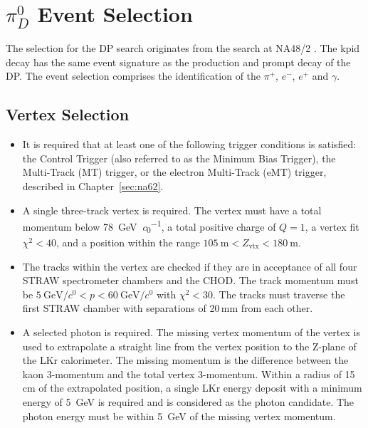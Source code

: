 \documentclass[../../main.tex]{subfiles}
\begin{document}
    \section{\boldmath $\pi^0_D$ \unboldmath Event Selection}
    The selection for the \gls{DP} search originates from the search at NA48/2 \cite{2015178}. The \gls{kpid} decay has the same event signature as the production and prompt decay of the \gls{DP}. The event selection comprises the identification of the $\pi^+$, $e^-$, $e^+$ and $\gamma$.
    \subsection{Vertex Selection}
    \begin{itemize}
        \item It is required that at least one of the following trigger conditions is satisfied: the Control Trigger (also referred to as the Minimum Bias Trigger), the Multi-Track (MT) trigger, or the electron Multi-Track (eMT) trigger, described in Chapter~\ref{sec:na62}.
        \item A single three-track vertex is required. The vertex must have a total momentum below \SI{78}{\giga\electronvolt\per\clight}, a total positive charge of $Q = 1$, a vertex fit $\chi^2 < 40$, and a position within the range $\SI{105}{\meter} < Z_{\text{vtx}} < \SI{180}{\meter}$.
        \item The tracks within the vertex are checked if they are in acceptance of all four STRAW spectrometer chambers and the CHOD. The track momentum must be $\SI{5}{\giga\electronvolt\per\clight} < p < \SI{60}{\giga\electronvolt\per\clight}$ with $\chi^2 < 30$. The tracks must traverse the first STRAW chamber with separations of 20\,mm from each other.
        \item A selected photon is required. The missing vertex momentum of the vertex is used to extrapolate a straight line from the vertex position to the Z-plane of the LKr calorimeter. The missing momentum is the difference between the kaon 3-momentum and the total vertex 3-momentum. Within a radius of 15\,cm of the extrapolated position, a single \gls{LKr} energy deposit
        with a minimum energy of \SI{5}{\giga\electronvolt} is required and is considered as the photon candidate. The photon energy must be within \SI{5}{\giga\electronvolt} of the missing vertex momentum.
    \end{itemize}
\end{document}
